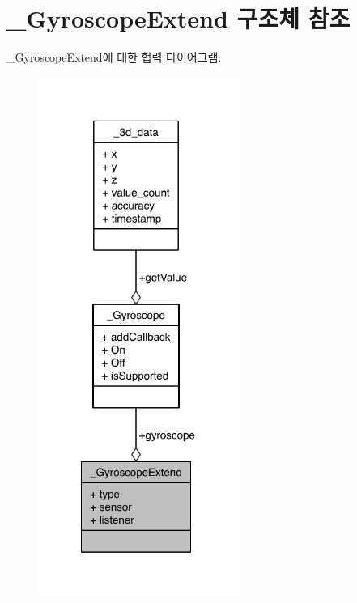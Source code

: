 \hypertarget{struct___gyroscope_extend}{\section{\-\_\-\-Gyroscope\-Extend 구조체 참조}
\label{struct___gyroscope_extend}
}


\-\_\-\-Gyroscope\-Extend에 대한 협력 다이어그램\-:\nopagebreak
\begin{figure}[H]
\begin{center}
\leavevmode
\includegraphics[width=185pt]{d1/d7a/struct___gyroscope_extend__coll__graph}
\end{center}
\end{figure}
